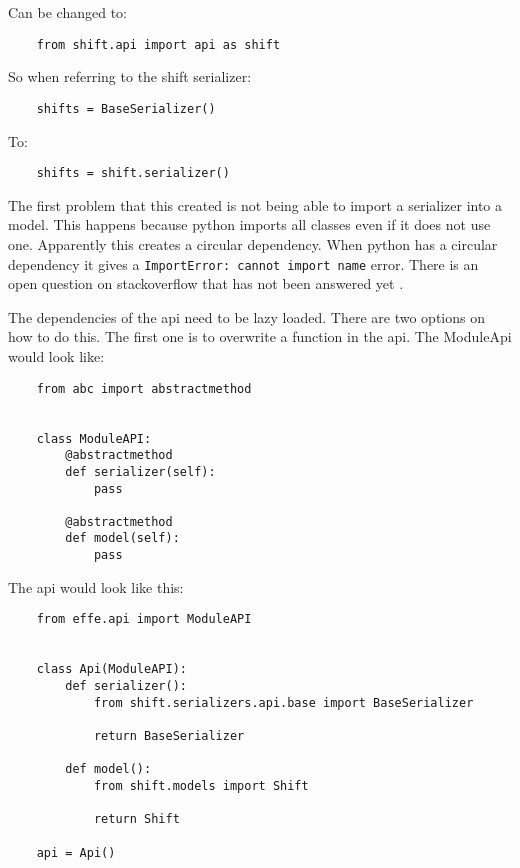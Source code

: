 Can be changed to:
\begin{verbatim}
    from shift.api import api as shift
\end{verbatim}

So when referring to the shift serializer:
\begin{verbatim}
    shifts = BaseSerializer()
\end{verbatim}

To:
\begin{verbatim}
    shifts = shift.serializer()
\end{verbatim}

The first problem that this created is not being able to import a serializer into a model. This happens because python imports all classes even if it does not use one. Apparently this creates a circular dependency. When python has a circular dependency it gives a \texttt{ImportError: cannot import name} error. There is an open question on stackoverflow that has not been answered yet \cite{circularDependencyQuestion}.

The dependencies of the api need to be lazy loaded. There are two options on how to do this. The first one is to overwrite a function in the api. The ModuleApi would look like:
\begin{verbatim}
    from abc import abstractmethod


    class ModuleAPI:
        @abstractmethod
        def serializer(self):
            pass

        @abstractmethod
        def model(self):
            pass
\end{verbatim}

The api would look like this:
\begin{verbatim}
    from effe.api import ModuleAPI


    class Api(ModuleAPI):
        def serializer():
            from shift.serializers.api.base import BaseSerializer

            return BaseSerializer

        def model():
            from shift.models import Shift

            return Shift

    api = Api()
\end{verbatim}

